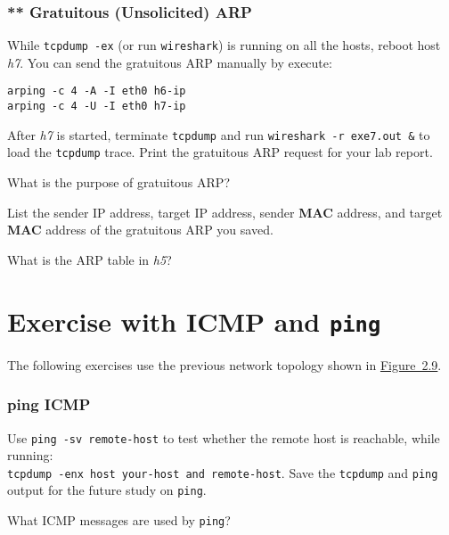 \documentclass{../UTNetLab}
\begin{document}
\section{** Gratuitous (Unsolicited) ARP}
    While \lstinline{tcpdump -ex} (or run \lstinline{wireshark}) is running on all the hosts, reboot host \textit{h7}.
    You can send the gratuitous ARP manually by execute:

    \begin{lstlisting}[emph={eth0,h7-ip,h6-ip}]
arping -c 4 -A -I eth0 h6-ip
arping -c 4 -U -I eth0 h7-ip
    \end{lstlisting}

    After \textit{h7} is started, terminate \lstinline{tcpdump} and run \lstinline{wireshark -r exe7.out &} to load the \lstinline{tcpdump} trace.
    Print the gratuitous ARP request for your lab report.
    
    \begin{report}
        \item What is the purpose of gratuitous ARP?
    
        \item List the sender IP address, target IP address, sender \textbf{MAC} address, and target \textbf{MAC} address of the gratuitous ARP you saved.

        \item What is the ARP table in \textit{h5}?
    \end{report}


\part{Exercise with ICMP and \texttt{ping}}\label{sec:icmp-ping}
    The following exercises use the previous network topology shown in \hyperref[fig:2.9]{Figure~2.9}.

\section{ping ICMP}
    Use \lstinline[emph={remote-host}]{ping -sv remote-host} to test whether the remote host is reachable, while running:
    \\\lstinline[emph={your-host, remote-host},morekeywords={[3]host,and}]{tcpdump -enx host your-host and remote-host}.
    Save the \lstinline{tcpdump} and \lstinline{ping} output for the future study on \lstinline{ping}.
    
    \begin{report}
        \item What ICMP messages are used by \lstinline{ping}?
    \end{report}
\end{document}
